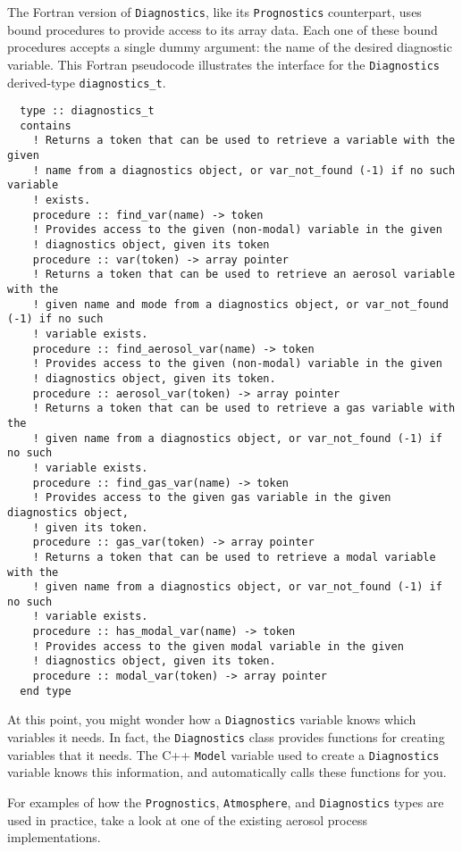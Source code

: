 The Fortran version of \texttt{Diagnostics}, like its \texttt{Prognostics} counterpart,
uses bound procedures to provide access to its array data. Each one of these
bound procedures accepts a single dummy argument: the name of the desired
diagnostic variable. This Fortran pseudocode illustrates the interface for the
\texttt{Diagnostics} derived-type \texttt{diagnostics\_t}.

\begin{lstlisting}
  type :: diagnostics_t
  contains
    ! Returns a token that can be used to retrieve a variable with the given
    ! name from a diagnostics object, or var_not_found (-1) if no such variable
    ! exists.
    procedure :: find_var(name) -> token
    ! Provides access to the given (non-modal) variable in the given
    ! diagnostics object, given its token
    procedure :: var(token) -> array pointer
    ! Returns a token that can be used to retrieve an aerosol variable with the
    ! given name and mode from a diagnostics object, or var_not_found (-1) if no such
    ! variable exists.
    procedure :: find_aerosol_var(name) -> token
    ! Provides access to the given (non-modal) variable in the given
    ! diagnostics object, given its token.
    procedure :: aerosol_var(token) -> array pointer
    ! Returns a token that can be used to retrieve a gas variable with the
    ! given name from a diagnostics object, or var_not_found (-1) if no such
    ! variable exists.
    procedure :: find_gas_var(name) -> token
    ! Provides access to the given gas variable in the given diagnostics object,
    ! given its token.
    procedure :: gas_var(token) -> array pointer
    ! Returns a token that can be used to retrieve a modal variable with the
    ! given name from a diagnostics object, or var_not_found (-1) if no such
    ! variable exists.
    procedure :: has_modal_var(name) -> token
    ! Provides access to the given modal variable in the given
    ! diagnostics object, given its token.
    procedure :: modal_var(token) -> array pointer
  end type
\end{lstlisting}

At this point, you might wonder how a \texttt{Diagnostics} variable knows which
variables it needs. In fact, the \texttt{Diagnostics} class provides functions for
creating variables that it needs. The C++ \texttt{Model} variable used to create
a \texttt{Diagnostics} variable knows this information, and automatically calls
these functions for you.

For examples of how the \texttt{Prognostics}, \texttt{Atmosphere}, and
\texttt{Diagnostics} types are used in practice, take a look at one of the
existing aerosol process implementations.

